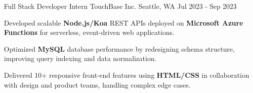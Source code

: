 \begin{cventries}
\vspace{2mm}
\cventry
    {Full Stack Developer Intern} %
    {TouchBase Inc.} %
    {Seattle, WA} %
    {Jul 2023 - Sep 2023} %
    {
      \begin{cvitems} %
        \item {Developed scalable \textbf{Node.js/Koa} REST APIs deployed on \textbf{Microsoft Azure Functions} for serverless, event-driven web applications.}
        \item {Optimized \textbf{MySQL} database performance by redesigning schema structure, improving query indexing and data normalization.}
        \item {Delivered 10+ responsive front-end features using \textbf{HTML/CSS} in collaboration with design and product teams, handling complex edge cases.}
      \end{cvitems}
    }
\end{cventries}
